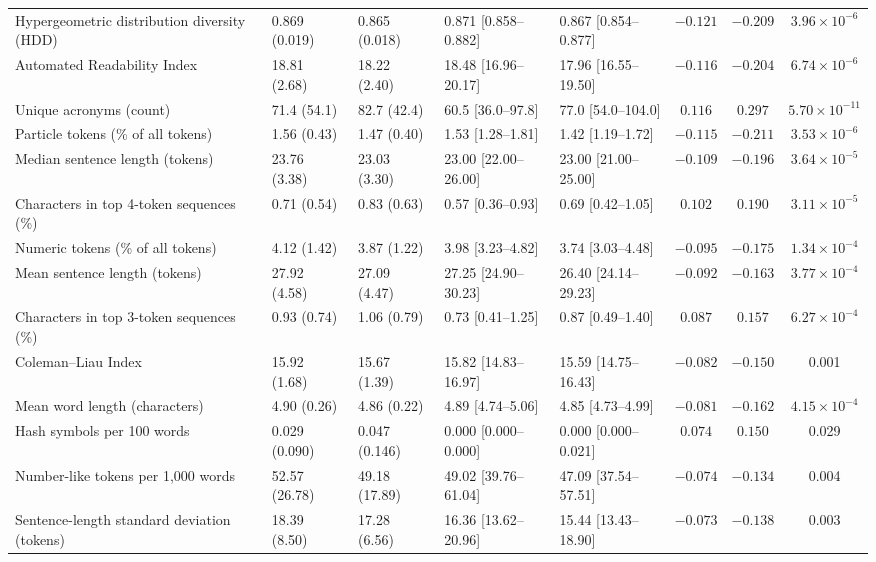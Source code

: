 \begin{landscape}
\begin{longtable}{@{}p{5.2cm}p{2.65cm}p{2.65cm}p{2.85cm}p{2.85cm}ccc@{}}
Hypergeometric distribution diversity (HDD) & 0.869 (0.019) & 0.865 (0.018) & 0.871 [0.858--0.882] & 0.867 [0.854--0.877] & $-0.121$ & $-0.209$ & $3.96 \times 10^{-6}$ \\
Automated Readability Index & 18.81 (2.68) & 18.22 (2.40) & 18.48 [16.96--20.17] & 17.96 [16.55--19.50] & $-0.116$ & $-0.204$ & $6.74 \times 10^{-6}$ \\
Unique acronyms (count) & 71.4 (54.1) & 82.7 (42.4) & 60.5 [36.0--97.8] & 77.0 [54.0--104.0] & $0.116$ & $0.297$ & $5.70 \times 10^{-11}$ \\
Particle tokens (\% of all tokens) & 1.56 (0.43) & 1.47 (0.40) & 1.53 [1.28--1.81] & 1.42 [1.19--1.72] & $-0.115$ & $-0.211$ & $3.53 \times 10^{-6}$ \\
Median sentence length (tokens) & 23.76 (3.38) & 23.03 (3.30) & 23.00 [22.00--26.00] & 23.00 [21.00--25.00] & $-0.109$ & $-0.196$ & $3.64 \times 10^{-5}$ \\
Characters in top 4-token sequences (\%) & 0.71 (0.54) & 0.83 (0.63) & 0.57 [0.36--0.93] & 0.69 [0.42--1.05] & $0.102$ & $0.190$ & $3.11 \times 10^{-5}$ \\
Numeric tokens (\% of all tokens) & 4.12 (1.42) & 3.87 (1.22) & 3.98 [3.23--4.82] & 3.74 [3.03--4.48] & $-0.095$ & $-0.175$ & $1.34 \times 10^{-4}$ \\
Mean sentence length (tokens) & 27.92 (4.58) & 27.09 (4.47) & 27.25 [24.90--30.23] & 26.40 [24.14--29.23] & $-0.092$ & $-0.163$ & $3.77 \times 10^{-4}$ \\
Characters in top 3-token sequences (\%) & 0.93 (0.74) & 1.06 (0.79) & 0.73 [0.41--1.25] & 0.87 [0.49--1.40] & $0.087$ & $0.157$ & $6.27 \times 10^{-4}$ \\
Coleman--Liau Index & 15.92 (1.68) & 15.67 (1.39) & 15.82 [14.83--16.97] & 15.59 [14.75--16.43] & $-0.082$ & $-0.150$ & 0.001 \\
Mean word length (characters) & 4.90 (0.26) & 4.86 (0.22) & 4.89 [4.74--5.06] & 4.85 [4.73--4.99] & $-0.081$ & $-0.162$ & $4.15 \times 10^{-4}$ \\
Hash symbols per 100 words & 0.029 (0.090) & 0.047 (0.146) & 0.000 [0.000--0.000] & 0.000 [0.000--0.021] & $0.074$ & $0.150$ & 0.029 \\
Number-like tokens per 1,000 words & 52.57 (26.78) & 49.18 (17.89) & 49.02 [39.76--61.04] & 47.09 [37.54--57.51] & $-0.074$ & $-0.134$ & 0.004 \\
Sentence-length standard deviation (tokens) & 18.39 (8.50) & 17.28 (6.56) & 16.36 [13.62--20.96] & 15.44 [13.43--18.90] & $-0.073$ & $-0.138$ & 0.003 \\

\end{longtable}
\end{landscape}
